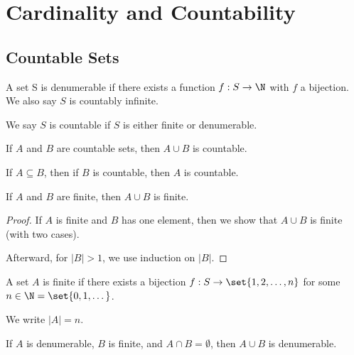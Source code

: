 \documentclass[10pt]{mypackage}
\begin{document}
\RaggedRight
\tableofcontents
\section{Cardinality and Countability}%
\subsection{Countable Sets}%
\begin{definition}
  A set S is denumerable if there exists a function $f: S\rightarrow \N$ with $f$ a bijection. We also say $S$ is countably infinite.
\end{definition}
\begin{definition}
  We say $S$ is countable if $S$ is either finite or denumerable.
\end{definition}
\begin{theorem}
  If $A$ and $B$ are countable sets, then $A\cup B$ is countable.
\end{theorem}
\begin{theorem}
  If $A\subseteq B$, then if $B$ is countable, then $A$ is countable.
\end{theorem}
\begin{theorem}
  If $A$ and $B$ are finite, then $A\cup B$ is finite.
\end{theorem}
\begin{proof}
  If $A$ is finite and $B$ has one element, then we show that $A\cup B$ is finite (with two cases).\newline
  
  Afterward, for $|B| > 1$, we use induction on $|B|$.
\end{proof}
\begin{definition}
  A set $A$ is finite if there exists a bijection $f: S\rightarrow \set{1,2,\dots,n}$ for some $n \in \N = \set{0,1,\dots}$.\newline

  We write $|A| = n$.
\end{definition}
\begin{theorem}
  If $A$ is denumerable, $B$ is finite, and $A\cap B = \emptyset$, then $A\cup B$ is denumerable.
\end{theorem}
\end{document}
